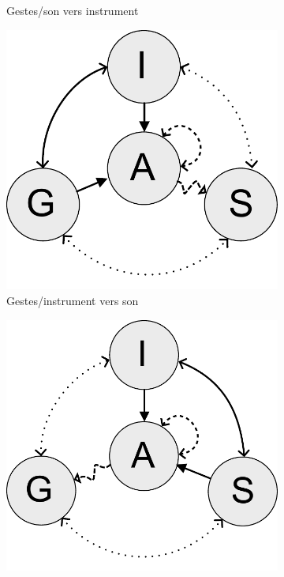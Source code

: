 \begin{figure}[!htbp]
{\begin{subfigure}[b]{.33\textwidth}
			\caption{Gestes/son vers instrument}
		\end{subfigure}%
		\hspace{.02\linewidth}
		\begin{subfigure}[b]{.33\textwidth}
			\centering
			\includegraphics[width=0.9\linewidth]{gfx/03_gesture/gesture-inference-k.pdf}
			\caption{Gestes/instrument vers son}
		\end{subfigure}%
		\hspace{.02\linewidth}
		\begin{subfigure}[b]{.33\textwidth}
			\centering
			\includegraphics[width=0.9\linewidth]{gfx/03_gesture/gesture-inference-l.pdf}

\end{subfigure}}
\end{figure}
